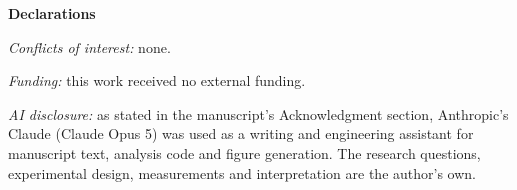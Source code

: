 \documentclass[11pt]{article}
\begin{document}
\vspace{0.8em}
\noindent\textbf{Declarations}

\noindent\emph{Conflicts of interest:} none.

\noindent\emph{Funding:} this work received no external funding.

\noindent\emph{AI disclosure:} as stated in the manuscript's Acknowledgment
section, Anthropic's Claude (Claude Opus 5) was used as a writing and
engineering assistant for manuscript text, analysis code and figure generation.
The research questions, experimental design, measurements and interpretation
are the author's own.
\end{document}
